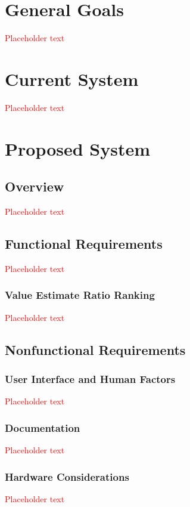 \documentclass[a4paper, 11pt, titlepage]{article}
\begin{document}
\pagebreak
{}

\section{General Goals}
\textcolor{red}{Placeholder text}

\section{Current System}
\textcolor{red}{Placeholder text}

\section{Proposed System}
\subsection{Overview}
\textcolor{red}{Placeholder text}

\subsection{Functional Requirements}
\textcolor{red}{Placeholder text}

\subsubsection{Value Estimate Ratio Ranking}
\textcolor{red}{Placeholder text}

\subsection{Nonfunctional Requirements}
\subsubsection{User Interface and Human Factors}
\textcolor{red}{Placeholder text}

\subsubsection{Documentation}
\textcolor{red}{Placeholder text}

\subsubsection{Hardware Considerations}
\textcolor{red}{Placeholder text}
\end{document}
